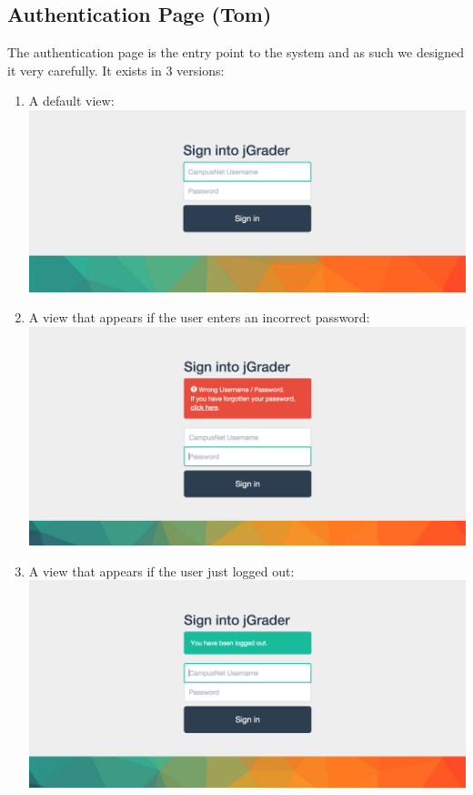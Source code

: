 \subsection{Authentication Page (Tom)}

The authentication page is the entry point to the system and as such we designed it very carefully. It exists in 3 versions:
\newpage
\begin{enumerate}
  \item A default view:
  	\subitem \includegraphics[width=.85\textwidth]{screenshots/SignIn.png}
  \item A view that appears if the user enters an incorrect password: 
   	\subitem \includegraphics[width=.85\textwidth]{screenshots/WrongPW.png}
  \item A view that appears if the user just logged out: 
   	\subitem \includegraphics[width=.85\textwidth]{screenshots/LogOut.png}
\end{enumerate}

